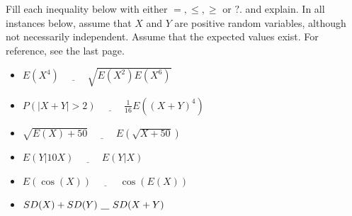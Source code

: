 \documentclass[11pt]{article}
\begin{document}
{\begin{exercise}
Fill each inequality below with either $=, \le, \ge$ or $?$. and explain. In all instances below, assume that $X$ and $Y$ are positive random variables, although not necessarily independent. Assume that the expected values exist. For reference, see the last page.
\begin{itemize} \itemsep 1.2cm
  \item $E(X^4) \ \underline{\hspace{1cm}} \ \sqrt{E(X^2)E(X^6)}$
  \item $P(|X+Y| > 2)  \ \underline{\hspace{1cm}} \ \frac{1}{16}E((X+Y)^4)$
  \item $\sqrt{E(X)+50}  \ \underline{\hspace{1cm}} \  E(\sqrt{X+50})$
  \item $E(Y|10X)  \ \underline{\hspace{1cm}} \  E(Y|X)$
  \item $E(\cos(X))  \ \underline{\hspace{1cm}} \  \cos(E(X))$
  \item $SD(X) + SD(Y) \ \underline{\hspace{0.3cm}} \ SD(X+Y)$
\end{itemize}
\end{exercise}

}
\end{document}
